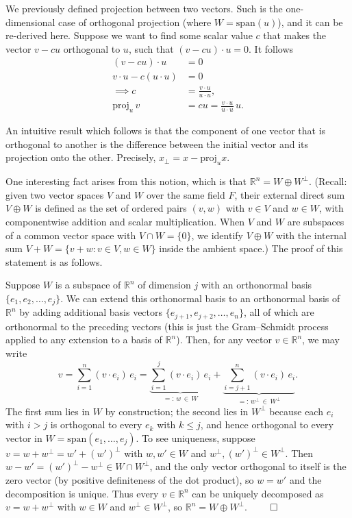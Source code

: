 \documentclass{article}
\begin{document}
We previously defined projection between two vectors. Such is the one-dimensional case of orthogonal projection (where $W = \mathrm{span}(u)$), and it can be re-derived here. Suppose we want to find some scalar value $c$ that makes the vector $v - c u$ orthogonal to $u$, such that $(v - c u) \cdot u = 0$. It follows
\begin{align*}
(v - c u) \cdot u &= 0 \\
v \cdot u - c (u \cdot u) &= 0 \\
\implies c &= \frac{v \cdot u}{u \cdot u}, \\[6pt]
\text{proj}_{u}\, v &= c u = \frac{v \cdot u}{u \cdot u}\, u.
\end{align*}

An intuitive result which follows is that the component of one vector that is orthogonal to another is the difference between the initial vector and its projection onto the other. Precisely, $x_\perp = x - \text{proj}_u x$.

One interesting fact arises from this notion, which is that $\mathbb{R}^n = W \oplus W^{\perp}$. (Recall: given two vector spaces $V$ and $W$ over the same field $F$, their external direct sum $V \oplus W$ is defined as the set of ordered pairs $(v, w)$ with $v \in V$ and $w \in W$, with componentwise addition and scalar multiplication. When $V$ and $W$ are subspaces of a common vector space with $V \cap W = \{0\}$, we identify $V \oplus W$ with the internal sum $V + W = \{v + w : v \in V, w \in W\}$ inside the ambient space.) The proof of this statement is as follows.

Suppose $W$ is a subspace of $\mathbb{R}^n$ of dimension $j$ with an orthonormal basis $\{e_1, e_2, \dots, e_j\}$. We can extend this orthonormal basis to an orthonormal basis of $\mathbb{R}^n$ by adding additional basis vectors $\{e_{j+1}, e_{j+2}, \dots, e_n\}$, all of which are orthonormal to the preceding vectors (this is just the Gram--Schmidt process applied to any extension to a basis of $\mathbb{R}^n$). Then, for any vector $v \in \mathbb{R}^n$, we may write
\[
v = \sum_{i=1}^n (v \cdot e_i)\, e_i 
= \underbrace{\sum_{i=1}^j (v \cdot e_i)\, e_i}_{=:\, w\, \in\, W} 
+ \underbrace{\sum_{i=j+1}^n (v \cdot e_i)\, e_i}_{=:\, w^{\perp}\, \in\, W^{\perp}}.
\]
The first sum lies in $W$ by construction; the second lies in $W^\perp$ because each $e_i$ with $i > j$ is orthogonal to every $e_k$ with $k \leq j$, and hence orthogonal to every vector in $W = \mathrm{span}(e_1, \dots, e_j)$. To see uniqueness, suppose $v = w + w^\perp = w' + (w')^\perp$ with $w, w' \in W$ and $w^\perp, (w')^\perp \in W^\perp$. Then $w - w' = (w')^\perp - w^\perp \in W \cap W^\perp$, and the only vector orthogonal to itself is the zero vector (by positive definiteness of the dot product), so $w = w'$ and the decomposition is unique. Thus every $v \in \mathbb{R}^n$ can be uniquely decomposed as $v = w + w^{\perp}$ with $w \in W$ and $w^{\perp} \in W^{\perp}$, so $\mathbb{R}^n = W \oplus W^{\perp}$. $\qed$\\
\end{document}
